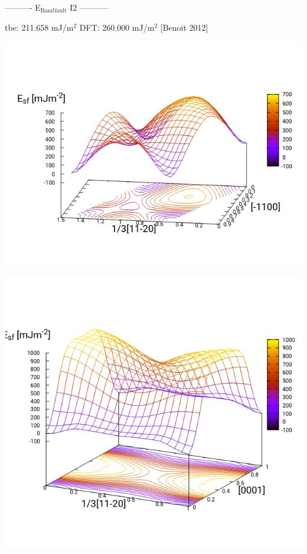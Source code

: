\documentclass[11pt]{article}
\begin{document}
----------     E\(_{\text{Basal}}\)\(_{\text{fault}}\) I2     -----------

tbe:       211.658 mJ/m\(^{\text{2}}\)
DFT:       260.000 mJ/m\(^{\text{2}}\) [Benoit  2012]

\begin{center}
\includegraphics[width=.9\linewidth]{Images/basal_gs_noo_2019-11-08_alat.png}
\end{center}

\begin{center}
\includegraphics[width=.9\linewidth]{Images/prismatic_gs_noo_2019-11-08_alat.png}
\end{center}
\end{document}
